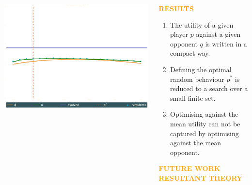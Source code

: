 \documentclass[usenames,dvipsnames,t]{beamer}
\begin{document}
\begin{columns}
\begin{column}{.7\linewidth}
\begin{columns}
\begin{column}{.5\linewidth}
\begin{center}
                \includegraphics[width=.7\textwidth]{static/tournament}
            \end{center}
        \end{column}
    \end{columns}
    \end{column}
    \begin{column}{.2\linewidth}
        \begin{center}
            \textcolor{orange}{\textbf{\Large{RESULTS}}}
        \begin{center}
            \begin{enumerate}
                \item The utility of a given player \(p\) against a given opponent \(q\) 
                is written in a compact way.
                \item Defining the optimal random behaviour \(p ^ *\) is reduced to a search over a small finite set.
                \item Optimising against the mean utility can not be captured by optimising against the mean opponent.
            \end{enumerate}
            \vspace{3cm}
    
            \begin{center}
                \textcolor{orange}{\textbf{\Large{FUTURE WORK}}} \\
                \textcolor{orange}{\textbf{\small{RESULTANT THEORY}}}
            \end{center}
        \begin{center}
            
        \end{center}
        \end{center}
        \end{center}
    \end{column}
\end{columns}
\vspace{1.5cm}
\end{document}
